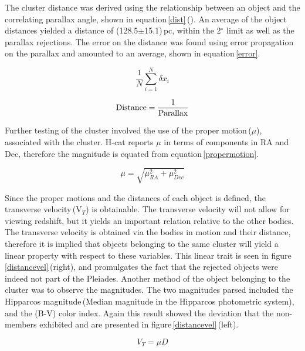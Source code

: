 \documentclass[onecolumn]{aastex6}
\begin{document}
The cluster distance was derived using the relationship between an object and the correlating parallax angle, shown in equation\,\ref{dist}\,(\cite{2}). An average of the object distances yielded a distance of (128.5$\pm$15.1)\,pc, within the 2$^\circ$ limit as well as the parallax rejections. The error on the distance was found using error propagation on the parallax and amounted to an average, shown in equation\,\ref{error}.

\begin{equation}
\frac{1}{N}\sum_{i=1}^N \delta x_i
\label{error}
\end{equation}

\begin{equation}
\textnormal{Distance} = \frac{1}{\textnormal{Parallax}}
\label{dist}
\end{equation}

Further testing of the cluster involved the use of the proper motion\,($\mu$), associated with the cluster. H-cat reports $\mu$ in terms of components in RA and Dec, therefore the magnitude is equated from equation\,\ref{propermotion}.

\begin{equation}
\mu = \sqrt{\mu_{RA}^2 + \mu_{Dec}^2}
\label{propermotion}
\end{equation}

Since the proper motions and the distances of each object is defined, the transverse velocity\,(V$_T$) is obtainable. The transverse velocity will not allow for viewing redshift, but it yields an important relation relative to the other bodies. The transverse velocity is obtained via the bodies in motion and their distance, therefore it is implied that objects belonging to the same cluster will yield a linear property with respect to these variables. This linear trait is seen in figure\,\ref{distancevel}\,(right), and promulgates the fact that the rejected objects were indeed not part of the Pleiades. Another method of the object belonging to the cluster was to observe the magnitudes. The two magnitudes parsed included the Hipparcos magnitude\,(Median magnitude in the Hipparcos photometric system), and the (B-V) color index. Again this result showed the deviation that the non-members exhibited and are presented in figure\,\ref{distancevel}\,(left).

\begin{equation}
V_T = \mu D
\end{equation}
\end{document}
